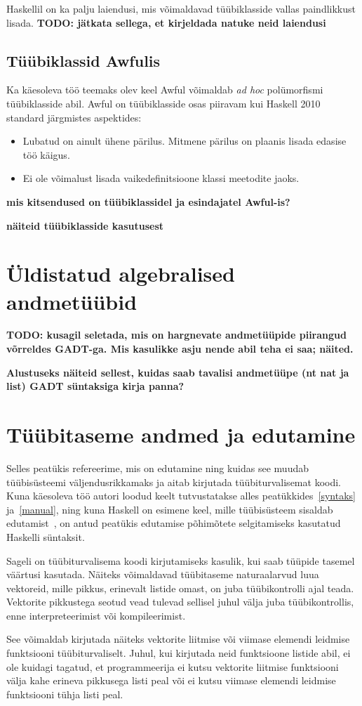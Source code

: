 \documentclass[12pt]{article}
\newcommand\peatykk[1]{
  \clearpage
  \section{#1}}
\newcommand\markus[1]{\textcolor{roheline}{\textbf{#1}}}
\begin{document}
      Haskellil on ka palju laiendusi, mis võimaldavad tüübiklasside vallas paindlikkust lisada. \markus{TODO: jätkata sellega, et kirjeldada natuke neid laiendusi}
    \subsection{Tüübiklassid Awfulis}
      Ka käesoleva töö teemaks olev keel Awful võimaldab \textit{ad hoc} polümorfismi tüübiklasside abil. Awful on tüübiklasside osas piiravam kui Haskell 2010 standard järgmistes aspektides:

      \begin{itemize}
        \item
          Lubatud on ainult ühene pärilus. Mitmene pärilus on plaanis lisada edasise töö käigus.
        \item
          Ei ole võimalust lisada vaikedefinitsioone klassi meetodite jaoks.
      \end{itemize}

      \markus{mis kitsendused on tüübiklassidel ja esindajatel Awful-is?}

      \markus{näiteid tüübiklasside kasutusest}
  \peatykk{Üldistatud algebralised andmetüübid}
    \markus{TODO: kusagil seletada, mis on hargnevate andmetüüpide piirangud võrreldes GADT-ga. Mis kasulikke asju nende abil teha ei saa; näited.}

    \markus{Alustuseks näiteid sellest, kuidas saab tavalisi andmetüüpe (nt nat ja list) GADT süntaksiga kirja panna?}
  \peatykk{Tüübitaseme andmed ja edutamine}
    Selles peatükis refereerime, mis on edutamine ning kuidas see muudab tüübisüsteemi väljendusrikkamaks ja aitab kirjutada tüübiturvalisemat koodi. Kuna käesoleva töö autori loodud keelt tutvustatakse alles peatükkides~\ref{syntaks} ja~\ref{manual}, ning kuna Haskell on esimene keel, mille tüübisüsteem sisaldab edutamist~\cite{Giv}, on antud peatükis edutamise põhimõtete selgitamiseks kasutatud Haskelli süntaksit.

    Sageli on tüübiturvalisema koodi kirjutamiseks kasulik, kui saab tüüpide tasemel väärtusi kasutada. Näiteks võimaldavad tüübitaseme naturaalarvud luua vektoreid, mille pikkus, erinevalt listide omast, on juba tüübikontrolli ajal teada. Vektorite pikkustega seotud vead tulevad sellisel juhul välja juba tüübikontrollis, enne interpreteerimist või kompileerimist.

    See võimaldab kirjutada näiteks vektorite liitmise või viimase elemendi leidmise funktsiooni tüübiturvaliselt. Juhul, kui kirjutada neid funktsioone listide abil, ei ole kuidagi tagatud, et programmeerija ei kutsu vektorite liitmise funktsiooni välja kahe erineva pikkusega listi peal või ei kutsu viimase elemendi leidmise funktsiooni tühja listi peal.
\end{document}
